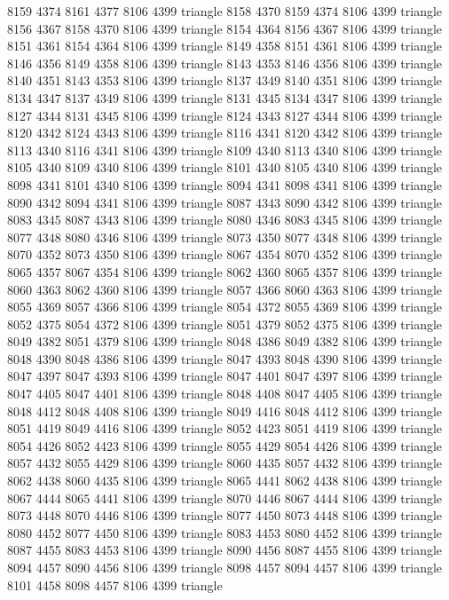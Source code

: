 8159 4374 8161 4377 8106 4399 triangle
8158 4370 8159 4374 8106 4399 triangle
8156 4367 8158 4370 8106 4399 triangle
8154 4364 8156 4367 8106 4399 triangle
8151 4361 8154 4364 8106 4399 triangle
8149 4358 8151 4361 8106 4399 triangle
8146 4356 8149 4358 8106 4399 triangle
8143 4353 8146 4356 8106 4399 triangle
8140 4351 8143 4353 8106 4399 triangle
8137 4349 8140 4351 8106 4399 triangle
8134 4347 8137 4349 8106 4399 triangle
8131 4345 8134 4347 8106 4399 triangle
8127 4344 8131 4345 8106 4399 triangle
8124 4343 8127 4344 8106 4399 triangle
8120 4342 8124 4343 8106 4399 triangle
8116 4341 8120 4342 8106 4399 triangle
8113 4340 8116 4341 8106 4399 triangle
8109 4340 8113 4340 8106 4399 triangle
8105 4340 8109 4340 8106 4399 triangle
8101 4340 8105 4340 8106 4399 triangle
8098 4341 8101 4340 8106 4399 triangle
8094 4341 8098 4341 8106 4399 triangle
8090 4342 8094 4341 8106 4399 triangle
8087 4343 8090 4342 8106 4399 triangle
8083 4345 8087 4343 8106 4399 triangle
8080 4346 8083 4345 8106 4399 triangle
8077 4348 8080 4346 8106 4399 triangle
8073 4350 8077 4348 8106 4399 triangle
8070 4352 8073 4350 8106 4399 triangle
8067 4354 8070 4352 8106 4399 triangle
8065 4357 8067 4354 8106 4399 triangle
8062 4360 8065 4357 8106 4399 triangle
8060 4363 8062 4360 8106 4399 triangle
8057 4366 8060 4363 8106 4399 triangle
8055 4369 8057 4366 8106 4399 triangle
8054 4372 8055 4369 8106 4399 triangle
8052 4375 8054 4372 8106 4399 triangle
8051 4379 8052 4375 8106 4399 triangle
8049 4382 8051 4379 8106 4399 triangle
8048 4386 8049 4382 8106 4399 triangle
8048 4390 8048 4386 8106 4399 triangle
8047 4393 8048 4390 8106 4399 triangle
8047 4397 8047 4393 8106 4399 triangle
8047 4401 8047 4397 8106 4399 triangle
8047 4405 8047 4401 8106 4399 triangle
8048 4408 8047 4405 8106 4399 triangle
8048 4412 8048 4408 8106 4399 triangle
8049 4416 8048 4412 8106 4399 triangle
8051 4419 8049 4416 8106 4399 triangle
8052 4423 8051 4419 8106 4399 triangle
8054 4426 8052 4423 8106 4399 triangle
8055 4429 8054 4426 8106 4399 triangle
8057 4432 8055 4429 8106 4399 triangle
8060 4435 8057 4432 8106 4399 triangle
8062 4438 8060 4435 8106 4399 triangle
8065 4441 8062 4438 8106 4399 triangle
8067 4444 8065 4441 8106 4399 triangle
8070 4446 8067 4444 8106 4399 triangle
8073 4448 8070 4446 8106 4399 triangle
8077 4450 8073 4448 8106 4399 triangle
8080 4452 8077 4450 8106 4399 triangle
8083 4453 8080 4452 8106 4399 triangle
8087 4455 8083 4453 8106 4399 triangle
8090 4456 8087 4455 8106 4399 triangle
8094 4457 8090 4456 8106 4399 triangle
8098 4457 8094 4457 8106 4399 triangle
8101 4458 8098 4457 8106 4399 triangle
